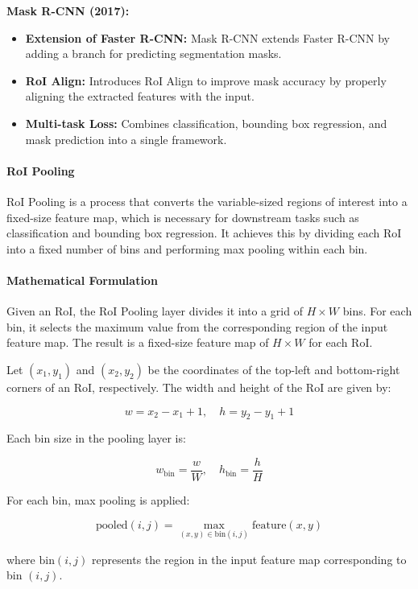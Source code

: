 \documentclass[12pt]{article}
\begin{document}
\textbf{Mask R-CNN (2017):}
\begin{itemize}
    \item \textbf{Extension of Faster R-CNN:} Mask R-CNN extends Faster R-CNN by adding a branch for predicting segmentation masks.
    \item \textbf{RoI Align:} Introduces RoI Align to improve mask accuracy by properly aligning the extracted features with the input.
    \item \textbf{Multi-task Loss:} Combines classification, bounding box regression, and mask prediction into a single framework.
\end{itemize}

\paragraph{RoI Pooling}

RoI Pooling is a process that converts the variable-sized regions of interest into a fixed-size feature map, which is necessary for downstream tasks such as classification and bounding box regression. It achieves this by dividing each RoI into a fixed number of bins and performing max pooling within each bin.

\paragraph{Mathematical Formulation}

Given an RoI, the RoI Pooling layer divides it into a grid of \( H \times W \) bins. For each bin, it selects the maximum value from the corresponding region of the input feature map. The result is a fixed-size feature map of \( H \times W \) for each RoI.

Let \((x_1, y_1)\) and \((x_2, y_2)\) be the coordinates of the top-left and bottom-right corners of an RoI, respectively. The width and height of the RoI are given by:

\[
w = x_2 - x_1 + 1, \quad h = y_2 - y_1 + 1
\]

Each bin size in the pooling layer is:

\[
w_{\text{bin}} = \frac{w}{W}, \quad h_{\text{bin}} = \frac{h}{H}
\]

For each bin, max pooling is applied:

\[
\text{pooled}(i, j) = \max_{(x, y) \in \text{bin}(i, j)} \text{feature}(x, y)
\]

where \( \text{bin}(i, j) \) represents the region in the input feature map corresponding to bin \( (i, j) \).
\end{document}
